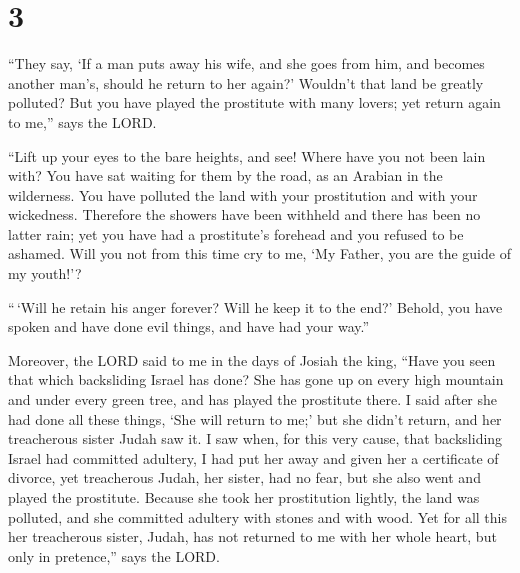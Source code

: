 \hypertarget{section-2}{%
\section{3}\label{section-2}}

 ``They say, `If a man puts away his wife, and she goes from
him, and becomes another man's, should he return to her again?' Wouldn't
that land be greatly polluted? But you have played the prostitute with
many lovers; yet return again to me,'' says the LORD.

 ``Lift up your eyes to the bare heights, and see! Where
have you not been lain with? You have sat waiting for them by the road,
as an Arabian in the wilderness. You have polluted the land with your
prostitution and with your wickedness.  Therefore the
showers have been withheld and there has been no latter rain; yet you
have had a prostitute's forehead and you refused to be ashamed.
 Will you not from this time cry to me, `My Father, you are
the guide of my youth!'?

 ``\,`Will he retain his anger forever? Will he keep it to
the end?' Behold, you have spoken and have done evil things, and have
had your way.''

 Moreover, the LORD said to me in the days of Josiah the
king, ``Have you seen that which backsliding Israel has done? She has
gone up on every high mountain and under every green tree, and has
played the prostitute there.  I said after she had done all
these things, `She will return to me;' but she didn't return, and her
treacherous sister Judah saw it.  I saw when, for this very
cause, that backsliding Israel had committed adultery, I had put her
away and given her a certificate of divorce, yet treacherous Judah, her
sister, had no fear, but she also went and played the prostitute.
 Because she took her prostitution lightly, the land was
polluted, and she committed adultery with stones and with wood.
 Yet for all this her treacherous sister, Judah, has not
returned to me with her whole heart, but only in pretence,'' says the
LORD.


